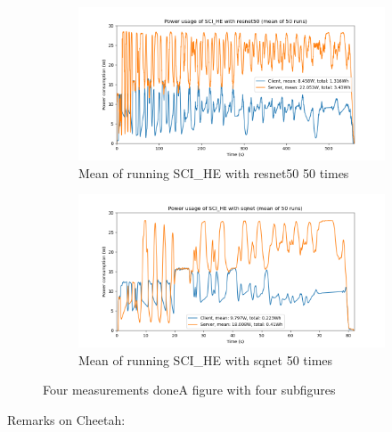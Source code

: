\documentclass[../thesis.tex]{subfiles}
\begin{document}
\begin{figure}[hbt!]
    \begin{subfigure}{.475\linewidth}
            \includegraphics[width=\textwidth]{Thesis/Images/Means/mean_SCI_HE-resnet50.png}
            \caption{Mean of running SCI\_HE with resnet50 50 times}
            \label{fig:mean_SCI_HE_resnet50}
    \end{subfigure}\hfill %
    \begin{subfigure}{.475\linewidth}
            \includegraphics[width=\textwidth]{Thesis/Images/Means/mean_SCI_HE-sqnet.png}
            \caption{Mean of running SCI\_HE with sqnet 50 times}
            \label{fig:mean_SCI_HE_sqnet}
    \end{subfigure}

    \caption{Four measurements doneA figure with four subfigures}
    \label{fig:4results}
\end{figure}
Remarks on Cheetah:
\end{document}
